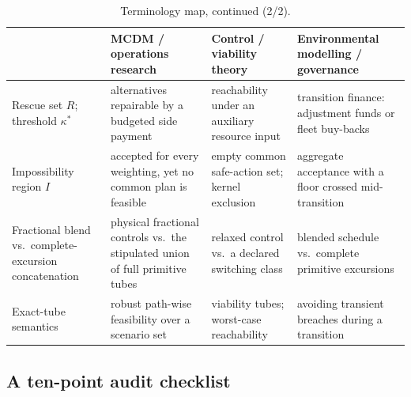 \documentclass[preprint,11pt,authoryear]{elsarticle}
\theoremstyle{remark}
\begin{document}
\begin{table}[!htbp]
\centering\small
\caption{Terminology map, continued (2/2).}
\label{tab:translation-controls}
\begin{tabularx}{\textwidth}{@{}>{\raggedright\arraybackslash}p{}>{\raggedright\arraybackslash}X>{\raggedright\arraybackslash}X>{\raggedright\arraybackslash}X@{}}
\toprule
 & MCDM / operations research & Control / viability theory & Environmental modelling / governance \\
\midrule
Rescue set $R$; threshold $\kappa^*$ & alternatives repairable by a budgeted side payment & reachability under an auxiliary resource input & transition finance: adjustment funds or fleet buy-backs \\
\addlinespace
Impossibility region $I$ & accepted for every weighting, yet no common plan is feasible & empty common safe-action set; kernel exclusion & aggregate acceptance with a floor crossed mid-transition \\
\addlinespace
Fractional blend vs.\ complete-excursion concatenation & physical fractional controls vs.\ the stipulated union of full primitive tubes & relaxed control vs.\ a declared switching class & blended schedule vs.\ complete primitive excursions \\
\addlinespace
Exact-tube semantics & robust path-wise feasibility over a scenario set & viability tubes; worst-case reachability & avoiding transient breaches during a transition \\
\bottomrule
\end{tabularx}
\end{table}

\subsection{A ten-point audit checklist}
\end{document}
